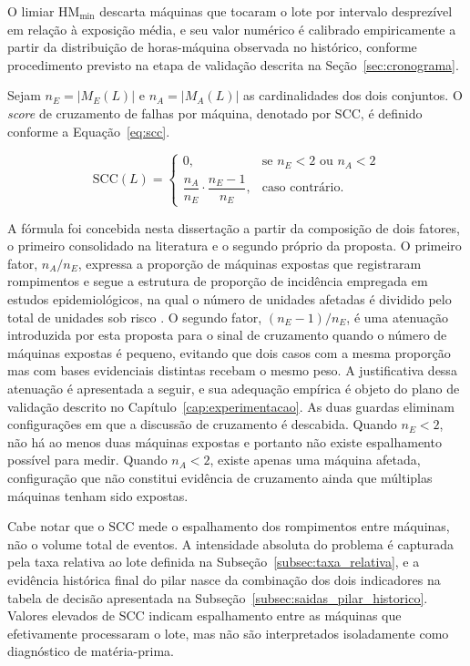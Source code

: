 O limiar $\text{HM}_{\min}$ descarta máquinas que tocaram o lote por intervalo desprezível em relação à exposição média, e seu valor numérico é calibrado empiricamente a partir da distribuição de horas-máquina observada no histórico, conforme procedimento previsto na etapa de validação descrita na Seção~\ref{sec:cronograma}.

Sejam $n_E = |M_E(L)|$ e $n_A = |M_A(L)|$ as cardinalidades dos dois conjuntos. O \emph{score} de cruzamento de falhas por máquina, denotado por $\text{SCC}$, é definido conforme a Equação~\ref{eq:scc}.

\begin{equation}
\text{SCC}(L) = \begin{cases}
0, & \text{se } n_E < 2 \text{ ou } n_A < 2 \\[4pt]
\dfrac{n_A}{n_E} \cdot \dfrac{n_E - 1}{n_E}, & \text{caso contrário.}
\end{cases}
\label{eq:scc}
\end{equation}
\vspace{0.4em}

A fórmula foi concebida nesta dissertação a partir da composição de dois fatores, o primeiro consolidado na literatura e o segundo próprio da proposta. O primeiro fator, $n_A / n_E$, expressa a proporção de máquinas expostas que registraram rompimentos e segue a estrutura de proporção de incidência empregada em estudos epidemiológicos, na qual o número de unidades afetadas é dividido pelo total de unidades sob risco \cite{rothman2008epidemiology}. O segundo fator, $(n_E - 1)/n_E$, é uma atenuação introduzida por esta proposta para o sinal de cruzamento quando o número de máquinas expostas é pequeno, evitando que dois casos com a mesma proporção mas com bases evidenciais distintas recebam o mesmo peso. A justificativa dessa atenuação é apresentada a seguir, e sua adequação empírica é objeto do plano de validação descrito no Capítulo~\ref{cap:experimentacao}. As duas guardas eliminam configurações em que a discussão de cruzamento é descabida. Quando $n_E < 2$, não há ao menos duas máquinas expostas e portanto não existe espalhamento possível para medir. Quando $n_A < 2$, existe apenas uma máquina afetada, configuração que não constitui evidência de cruzamento ainda que múltiplas máquinas tenham sido expostas.

Cabe notar que o $\text{SCC}$ mede o espalhamento dos rompimentos entre máquinas, não o volume total de eventos. A intensidade absoluta do problema é capturada pela taxa relativa ao lote definida na Subseção~\ref{subsec:taxa_relativa}, e a evidência histórica final do pilar nasce da combinação dos dois indicadores na tabela de decisão apresentada na Subseção~\ref{subsec:saidas_pilar_historico}. Valores elevados de $\text{SCC}$ indicam espalhamento entre as máquinas que efetivamente processaram o lote, mas não são interpretados isoladamente como diagnóstico de matéria-prima.

